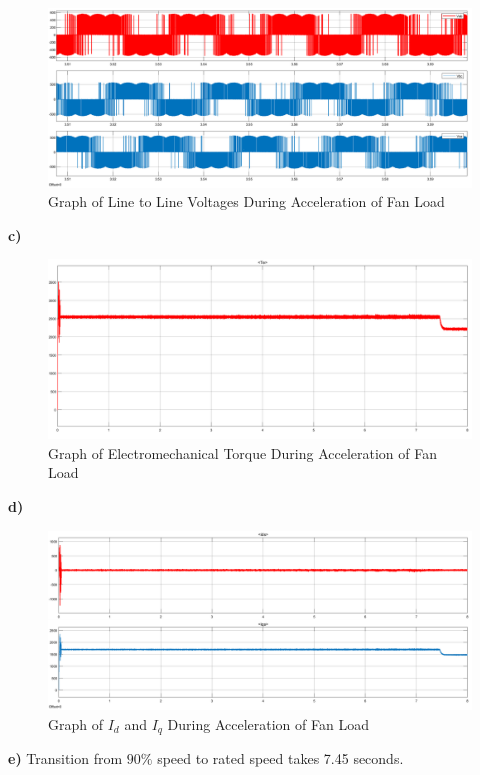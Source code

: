 \documentclass{article}
\begin{document}
\begin{figure}[H]
    \centering
    \includegraphics[scale=0.2]{q1_volts.png}
    \caption{Graph of Line to Line Voltages During Acceleration of Fan Load }
    \label{fig:my_label}
\end{figure} \newpage
\textbf{c)}
\begin{figure}[H]
    \centering
    \includegraphics[scale=0.2]{q1_torque.png}
    \caption{Graph of Electromechanical Torque During Acceleration of Fan Load }
    \label{fig:my_label}
\end{figure}
\textbf{d)}
\begin{figure}[H]
    \centering
    \includegraphics[scale=0.2]{q1_dq.png}
    \caption{Graph of $I_d$ and $I_q$ During Acceleration of Fan Load }
    \label{fig:my_label}
\end{figure}
\textbf{e)} Transition from $90 \%$ speed to rated speed takes 7.45 seconds. \\
\end{document}

